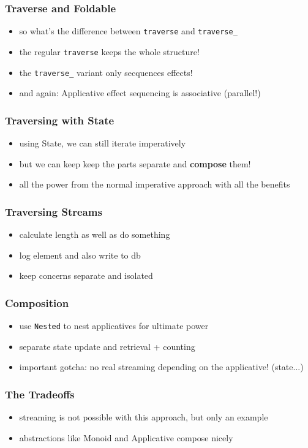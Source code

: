 \documentclass{beamer}
\begin{document}
\begin{frame}
  \frametitle{Traverse and Foldable}
  \begin{itemize}
  \item so what's the difference between \texttt{traverse} and \texttt{traverse\_}
  \item the regular \texttt{traverse} keeps the whole structure!
  \item the \texttt{traverse\_} variant only secquences effects!
  \item and again: Applicative effect sequencing is associative (parallel!)
  \end{itemize}
\end{frame}

\begin{frame}
  \frametitle{Traversing with State}
  \begin{itemize}
  \item using State, we can still iterate imperatively
  \item but we can keep keep the parts separate and \textbf{compose} them!
  \item all the power from the normal imperative approach with all the benefits
  \end{itemize}
\end{frame}

\begin{frame}
  \frametitle{Traversing Streams}
  \begin{itemize}
  \item calculate length as well as do something
  \item log element and also write to db
  \item keep concerns separate and isolated
  \end{itemize}
\end{frame}

\begin{frame}
  \frametitle{Composition}
  \begin{itemize}
  \item use \texttt{Nested} to nest applicatives for ultimate power
  \item separate state update and retrieval + counting
  \item important gotcha: no real streaming depending on the applicative! (state...)
  \end{itemize}
\end{frame}

\begin{frame}
  \frametitle{The Tradeoffs}
  \begin{itemize}
  \item streaming is not possible with this approach, but only an example
  \item abstractions like Monoid and Applicative compose nicely
  \end{itemize}
\end{frame}
\end{document}
